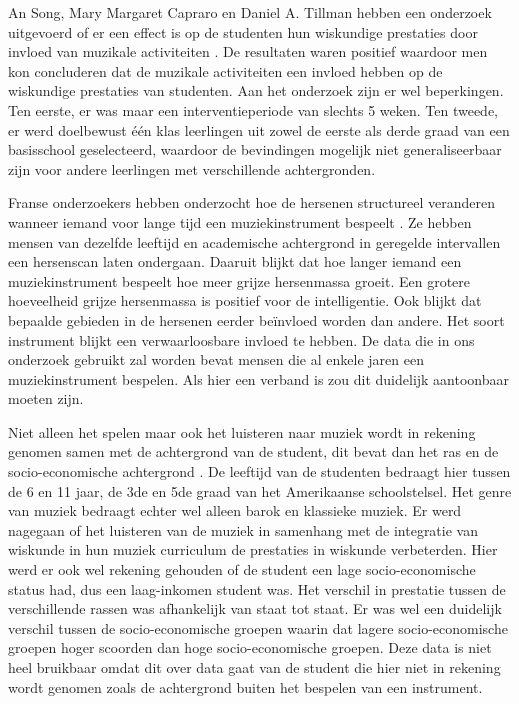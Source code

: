 \documentclass{hogent-article}
\begin{document}
An Song, Mary Margaret Capraro en Daniel A. Tillman hebben een onderzoek uitgevoerd of er een effect is op de studenten hun wiskundige prestaties door invloed van muzikale activiteiten \autocite{An2013}. De resultaten waren positief waardoor men kon concluderen dat de muzikale activiteiten een invloed hebben op de wiskundige prestaties van studenten. Aan het onderzoek zijn er wel beperkingen. Ten eerste, er was maar een interventieperiode van slechts 5 weken. Ten tweede, er werd doelbewust één klas leerlingen uit zowel de eerste als derde graad van een basisschool geselecteerd, waardoor de bevindingen mogelijk niet generaliseerbaar zijn voor andere leerlingen met verschillende achtergronden.

Franse onderzoekers hebben onderzocht hoe de hersenen structureel veranderen wanneer iemand voor lange tijd een muziekinstrument bespeelt \autocite{Groussard2014}. Ze hebben mensen van dezelfde leeftijd en academische achtergrond in geregelde intervallen een hersenscan laten ondergaan. Daaruit blijkt dat hoe langer iemand een muziekinstrument bespeelt hoe meer grijze hersenmassa groeit. Een grotere hoeveelheid grijze hersenmassa is positief voor de intelligentie. Ook blijkt dat bepaalde gebieden in de hersenen eerder beïnvloed worden dan andere. Het soort instrument blijkt een verwaarloosbare invloed te hebben. De data die in ons onderzoek gebruikt zal worden bevat mensen die al enkele jaren een muziekinstrument bespelen. Als hier een verband is zou dit duidelijk aantoonbaar moeten zijn.

Niet alleen het spelen maar ook het luisteren naar muziek wordt in rekening genomen samen met de achtergrond van de student, dit bevat dan het ras en de socio-economische achtergrond \autocite{Albright2011}. De leeftijd van de studenten bedraagt hier tussen de 6 en 11 jaar, de 3de en 5de graad van het Amerikaanse schoolstelsel. Het genre van muziek bedraagt echter wel alleen barok en klassieke muziek. Er werd nagegaan of het luisteren van de muziek in samenhang met de integratie van wiskunde in hun muziek curriculum de prestaties in wiskunde verbeterden. Hier werd er ook wel rekening gehouden of de student een lage socio-economische status had, dus een laag-inkomen student was. Het verschil in prestatie tussen de verschillende rassen was afhankelijk van staat tot staat. Er was wel een duidelijk verschil tussen de socio-economische groepen waarin dat lagere socio-economische groepen hoger scoorden dan hoge socio-economische groepen. Deze data is niet heel bruikbaar omdat dit over data gaat van de student die hier niet in rekening wordt genomen zoals de achtergrond buiten het bespelen van een instrument.
\end{document}
